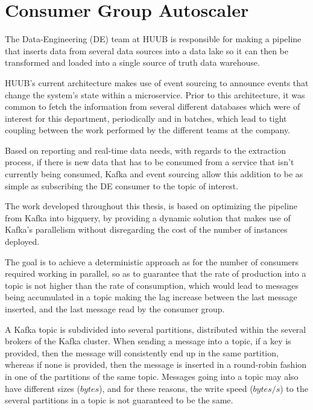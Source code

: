 \chapter{Consumer Group Autoscaler} \label{chap:consumer_group_autoscaler}

The Data-Engineering (DE) team at HUUB is responsible for making a pipeline that
inserts data from several data sources into a data lake so it can then be
transformed and loaded into a single source of truth data warehouse. 

HUUB's current architecture makes use of event sourcing to announce events that
change the system's state within a microservice. Prior to this architecture, it
was common to fetch the information from several different databases which were
of interest for this department, periodically and in batches, which lead to
tight coupling between the work performed by the different teams at the company.

Based on reporting and real-time data needs, with regards to the extraction
process, if there is new data that has to be consumed from a service that isn't
currently being consumed, Kafka and event sourcing allow this addition to be as
simple as subscribing the DE consumer to the topic of interest.

The work developed throughout this thesis, is based on optimizing the pipeline
from Kafka into bigquery, by providing a dynamic solution that makes use of
Kafka's parallelism without disregarding the cost of the number of instances
deployed. 

The goal is to achieve a deterministic approach as for the number of consumers
required working in parallel, so as to guarantee that the rate of production
into a topic is not higher than the rate of consumption, which would lead to
messages being accumulated in a topic making the lag increase between the last
message inserted, and the last message read by the consumer group.

A Kafka topic is subdivided into several partitions, distributed within the
several brokers of the Kafka cluster. When sending a message into a topic, if a
key is provided, then the message will consistently end up in the same
partition, whereas if none is provided, then the message is inserted in a
round-robin fashion in one of the partitions of the same topic. Messages going
into a topic may also have different sizes ($bytes$), and for these reasons, the
write speed ($bytes/s$) to the several partitions in a topic is not guaranteed
to be the same. 

